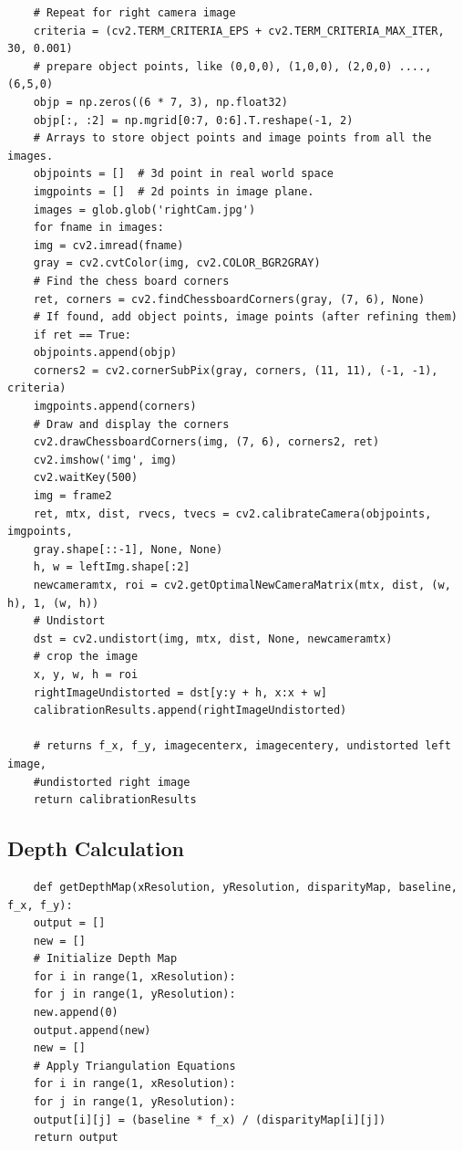 \documentclass[11pt]{scrartcl}
\begin{document}
\begin{verbatim}
	# Repeat for right camera image
	criteria = (cv2.TERM_CRITERIA_EPS + cv2.TERM_CRITERIA_MAX_ITER, 30, 0.001)
	# prepare object points, like (0,0,0), (1,0,0), (2,0,0) ....,(6,5,0)
	objp = np.zeros((6 * 7, 3), np.float32)
	objp[:, :2] = np.mgrid[0:7, 0:6].T.reshape(-1, 2)
	# Arrays to store object points and image points from all the images.
	objpoints = []  # 3d point in real world space
	imgpoints = []  # 2d points in image plane.
	images = glob.glob('rightCam.jpg')
	for fname in images:
	img = cv2.imread(fname)
	gray = cv2.cvtColor(img, cv2.COLOR_BGR2GRAY)
	# Find the chess board corners
	ret, corners = cv2.findChessboardCorners(gray, (7, 6), None)
	# If found, add object points, image points (after refining them)
	if ret == True:
	objpoints.append(objp)
	corners2 = cv2.cornerSubPix(gray, corners, (11, 11), (-1, -1), criteria)
	imgpoints.append(corners)
	# Draw and display the corners
	cv2.drawChessboardCorners(img, (7, 6), corners2, ret)
	cv2.imshow('img', img)
	cv2.waitKey(500)
	img = frame2
	ret, mtx, dist, rvecs, tvecs = cv2.calibrateCamera(objpoints, imgpoints, 
	gray.shape[::-1], None, None)
	h, w = leftImg.shape[:2]
	newcameramtx, roi = cv2.getOptimalNewCameraMatrix(mtx, dist, (w, h), 1, (w, h))
	# Undistort
	dst = cv2.undistort(img, mtx, dist, None, newcameramtx)
	# crop the image
	x, y, w, h = roi
	rightImageUndistorted = dst[y:y + h, x:x + w]
	calibrationResults.append(rightImageUndistorted)
	
	# returns f_x, f_y, imagecenterx, imagecentery, undistorted left image, 
	#undistorted right image
	return calibrationResults
\end{verbatim}

\subsection{Depth Calculation}
\begin{verbatim}
	def getDepthMap(xResolution, yResolution, disparityMap, baseline, f_x, f_y):
	output = []
	new = []
	# Initialize Depth Map
	for i in range(1, xResolution):
	for j in range(1, yResolution):
	new.append(0)
	output.append(new)
	new = []
	# Apply Triangulation Equations
	for i in range(1, xResolution):
	for j in range(1, yResolution):
	output[i][j] = (baseline * f_x) / (disparityMap[i][j])
	return output
\end{verbatim}
\newpage
\end{document}
